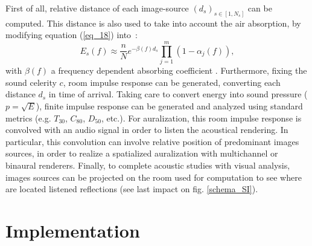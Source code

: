 \documentclass{aes2e}
\begin{document}
First of all, relative distance of each image-source $(d_s)_{s \in [1, N_s]}$ can be computed. This distance is also used to take into account the air absorption, by modifying equation (\ref{eq_18}) into~:
\begin{equation}
E_s(f) \approx  \frac{n}{N}  e^{-\beta(f) d_s}  \prod_{j=1}^{m}(1 - \alpha_j(f)),
\label{eq_19}
\end{equation}    
with $\beta(f)$ a frequency dependent absorbing coefficient \cite{iso}. Furthermore, fixing the sound celerity $c$, room impulse response can be generated, converting each distance $d_s$ in time of arrival. Taking care to convert energy into sound pressure ($p = \sqrt{E}$), finite impulse response can be generated and analyzed using standard metrics (e.g. $T_{30}$, $C_{80}$, $D_{50}$, etc.). For auralization, this room impulse response is convolved with an audio signal in order to listen the acoustical rendering. In particular, this convolution can involve relative position of predominant images sources, in order to realize a spatialized auralization with multichannel or binaural renderers. Finally, to complete acoustic studies with visual analysis, images sources can be projected on the room used for computation to see where are located listened reflections (see last impact on fig. \ref{schema_SI}).



\section{Implementation}
\end{document}
